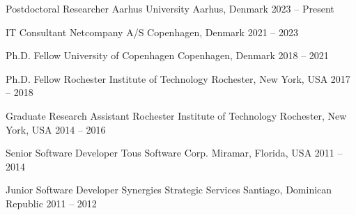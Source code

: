 

\begin{cventries}
  \cventry
    {Postdoctoral Researcher}
    {Aarhus University}
    {Aarhus, Denmark}
    {2023 -- Present}
    {}

  \cventry
    {IT Consultant}
    {Netcompany A/S}
    {Copenhagen, Denmark}
    {2021 -- 2023}
    {}

  \cventry
    {Ph.D. Fellow}
    {University of Copenhagen}
    {Copenhagen, Denmark}
    {2018 -- 2021}
    {}

  \cventry
    {Ph.D. Fellow}
    {Rochester Institute of Technology}
    {Rochester, New York, USA}
    {2017 -- 2018}
    {}

  \cventry
    {Graduate Research Assistant}
    {Rochester Institute of Technology}
    {Rochester, New York, USA}
    {2014 -- 2016}
    {}

  \cventry
    {Senior Software Developer}
    {Tous Software Corp.}
    {Miramar, Florida, USA}
    {2011 -- 2014}
    {}

  \cventry
    {Junior Software Developer}
    {Synergies Strategic Services}
    {Santiago, Dominican Republic}
    {2011 -- 2012}
    {}
	
\end{cventries}
